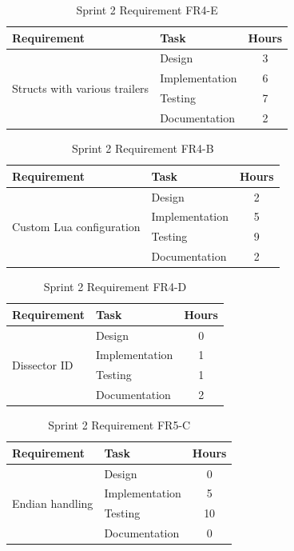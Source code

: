 \begin{table}[!ht] \small \center
\caption{Sprint 2 Requirement FR4-E\label{tab:sp2_req4e}}
\begin{tabular}{l l c}
	\toprule
	Requirement & Task & Hours \\
	\midrule
	\multirow{4}{5cm}{Structs with various trailers} & Design & 3 \\
	& Implementation & 6 \\
	& Testing & 7 \\
	& Documentation & 2 \\
	\bottomrule
\end{tabular}
\end{table}

\begin{table}[!ht] \small \center
\caption{Sprint 2 Requirement FR4-B\label{tab:sp2_req4b}}
\begin{tabular}{l l c}
	\toprule
	Requirement & Task & Hours \\
	\midrule
	\multirow{4}{5cm}{Custom Lua configuration} & Design & 2 \\
	& Implementation & 5 \\
	& Testing & 9 \\
	& Documentation & 2 \\
	\bottomrule
\end{tabular}
\end{table}

\begin{table}[!ht] \small \center
\caption{Sprint 2 Requirement FR4-D\label{tab:sp2_req4d}}
\begin{tabular}{l l c}
	\toprule
	Requirement & Task & Hours \\
	\midrule
	\multirow{4}{5cm}{Dissector ID} & Design & 0 \\
	& Implementation & 1 \\
	& Testing & 1 \\
	& Documentation & 2 \\
	\bottomrule
\end{tabular}
\end{table}

\begin{table}[!ht] \small \center
\caption{Sprint 2 Requirement FR5-C\label{tab:sp2_req5c}}
\begin{tabular}{l l c}
	\toprule
	Requirement & Task & Hours \\
	\midrule
	\multirow{4}{5cm}{Endian handling} & Design & 0 \\
	& Implementation & 5 \\
	& Testing & 10 \\
	& Documentation & 0 \\
	\bottomrule
\end{tabular}
\end{table}

